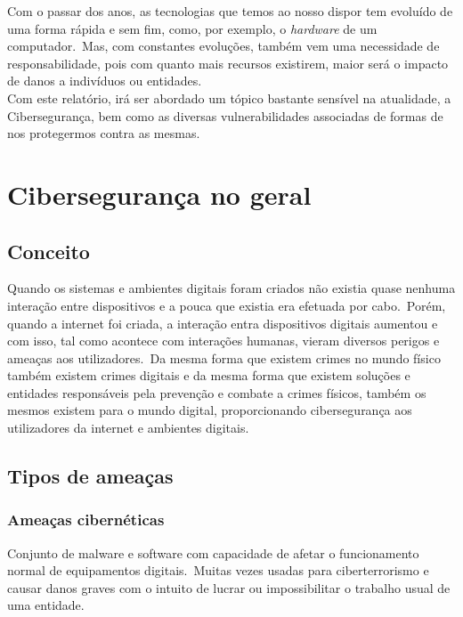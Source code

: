 \documentclass{report}
\begin{document}
Com o passar dos anos, as tecnologias que temos ao nosso dispor tem evoluído de uma forma rápida e sem fim, como, por exemplo, o \textit{hardware} de um computador.\ Mas, com constantes evoluções, também vem uma necessidade de responsabilidade, pois com quanto mais recursos existirem, maior será o impacto de danos a indivíduos ou entidades.\\

Com este relatório, irá ser abordado um tópico bastante sensível na atualidade, a Cibersegurança, bem como as diversas vulnerabilidades associadas de formas de nos protegermos contra as mesmas.

\chapter{Cibersegurança no geral}
\label{ch:ciberseguranca-no-geral}
\section{Conceito}
Quando os sistemas e ambientes digitais foram criados não existia quase nenhuma interação entre dispositivos e a pouca que existia era efetuada por cabo.\ Porém, quando a internet foi criada, a interação entra dispositivos digitais aumentou e com isso, tal como acontece com interações humanas, vieram diversos perigos e ameaças aos utilizadores.\ Da mesma forma que existem crimes no mundo físico também existem crimes digitais e da mesma forma que existem soluções e entidades responsáveis pela prevenção e combate a crimes físicos, também os mesmos existem para o mundo digital, proporcionando cibersegurança aos utilizadores da internet e ambientes digitais.

\section{Tipos de ameaças}
\label{sec:ameacas}
\subsection{Ameaças cibernéticas}
Conjunto de malware e software com capacidade de afetar o funcionamento normal de equipamentos digitais.\ Muitas vezes usadas para ciberterrorismo e causar danos graves com o intuito de lucrar ou impossibilitar o trabalho usual de uma entidade.\\
\end{document}
